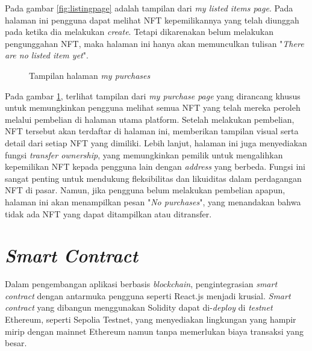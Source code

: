   Pada gambar \ref{fig:listingpage} adalah tampilan dari \emph{my listed items page}. Pada halaman ini pengguna dapat melihat NFT kepemilikannya yang telah diunggah pada ketika dia melakukan \emph{create}. Tetapi dikarenakan belum melakukan pengunggahan NFT, maka halaman ini hanya akan memunculkan tulisan "\emph{There are no listed item yet}".

  \begin{figure} [H] \centering
    \caption{Tampilan halaman \emph{my purchases}}
    \label{fig:purchasepage}
    \end{figure}
  
  Pada gambar \ref{fig:purchasepage}, terlihat tampilan dari \emph{my purchase page} yang dirancang khusus untuk memungkinkan pengguna melihat semua NFT yang telah mereka peroleh melalui pembelian di halaman utama platform. Setelah melakukan pembelian, NFT tersebut akan terdaftar di halaman ini, memberikan tampilan visual serta detail dari setiap NFT yang dimiliki. Lebih lanjut, halaman ini juga menyediakan fungsi \emph{transfer ownership}, yang memungkinkan pemilik untuk mengalihkan kepemilikan NFT kepada pengguna lain dengan \emph{address} yang berbeda. Fungsi ini sangat penting untuk mendukung fleksibilitas dan likuiditas dalam perdagangan NFT di pasar. Namun, jika pengguna belum melakukan pembelian apapun, halaman ini akan menampilkan pesan "\emph{No purchases}", yang menandakan bahwa tidak ada NFT yang dapat ditampilkan atau ditransfer.

\section{\emph{Smart Contract}}
  Dalam pengembangan aplikasi berbasis \emph{blockchain}, pengintegrasian \emph{smart contract} dengan antarmuka pengguna seperti React.js menjadi krusial. \emph{Smart contract} yang dibangun menggunakan Solidity dapat di-\emph{deploy} di \emph{testnet} Ethereum, seperti Sepolia Testnet, yang menyediakan lingkungan yang hampir mirip dengan mainnet Ethereum namun tanpa memerlukan biaya transaksi yang besar. 
  
